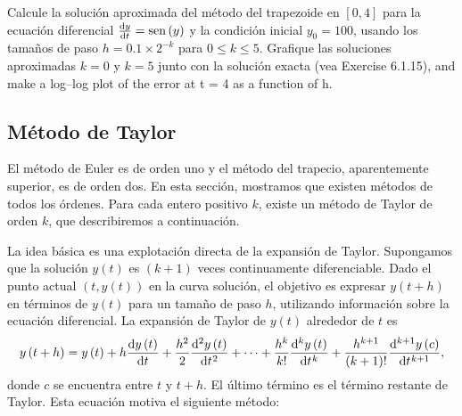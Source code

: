 \begin{questions}
\begin{multicols}{3}
    \end{multicols}

    \question

    Calcule la solución aproximada del método del trapezoide en $\left[0,4\right]$
    para la ecuación diferencial $\diff{y}{t}=\operatorname{sen}\left(y\right)$
    y la condición inicial $y_{0}=100$, usando los tamaños de paso
    $h=0.1\times 2^{-k}$ para $0\leq k\leq 5$.
    Grafique las soluciones aproximadas $k=0$ y $k=5$ junto con la
    solución exacta (vea Exercise 6.1.15), and make a log–log plot of the error at t = 4 as a function of h.
\end{questions}

\subsection{Método de Taylor}

El método de Euler es de orden uno y el método del trapecio,
aparentemente superior, es de orden dos.
En esta sección, mostramos que existen métodos de todos los órdenes.
Para cada entero positivo $k$, existe un método de Taylor de orden
$k$, que describiremos a continuación.

La idea básica es una explotación directa de la expansión de Taylor.
Supongamos que la solución $y\left(t\right)$ es $\left(k+1\right)$
veces continuamente diferenciable.
Dado el punto actual $\left(t,y\left(t\right)\right)$ en la curva
solución, el objetivo es expresar $y\left(t+h\right)$ en términos de
$y\left(t\right)$ para un tamaño de paso $h$, utilizando información
sobre la ecuación diferencial.
La expansión de Taylor de $y\left(t\right)$ alrededor de $t$ es
\begin{equation*}
    y\left(t+h\right)=
    y\left(t\right)+
    h\diff{y\left(t\right)}{t}+
    \frac{h^{2}}{2}
    \diff[2]{y\left(t\right)}{t}+
    \cdots+
    \frac{h^{k}}{k!}
    \diff[k]{y\left(t\right)}{t}+
    \frac{h^{k+1}}{\left(k+1\right)!}
    \diff[k+1]{y\left(c\right)}{t},
\end{equation*}
donde $c$ se encuentra entre $t$ y $t+h$.
El último término es el término restante de Taylor.
Esta ecuación motiva el siguiente método:

